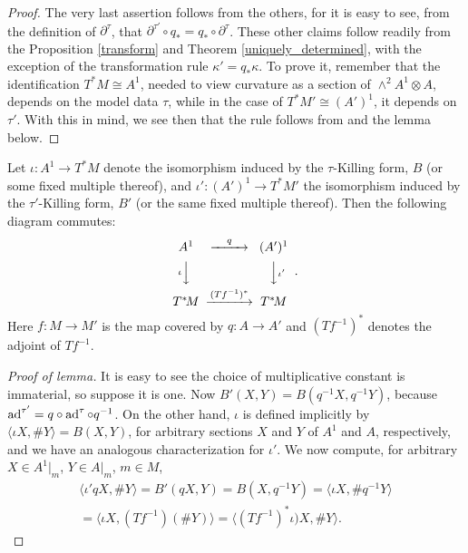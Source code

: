 \documentclass[leqno,12pt]{amsart} %
\begin{document}
\begin{proof}
  The very last assertion follows from the others, for it is easy to see, from the
  definition  of $\partial^\tau$, that
  $\partial^{\tau'} \circ q_* = q_* \circ \partial^\tau$. These other claims follow
  readily from the Proposition \ref{transform} and Theorem \ref{uniquely_determined}, with
  the exception of the transformation rule $\kappa' = q_* \kappa $. To prove it, remember
  that the identification $T^*\!M \cong A^1$, needed to view curvature as a section of
  $\wedge^2 A^1 \otimes A$, depends on the model data $\tau $, while in the case of
  $T^*\!M' \cong (A')^1$, it depends on $\tau'$. With this in mind, we see then that the
  rule follows from  and the lemma below.
\end{proof}

\begin{lemma}
  Let $\iota\colon A^1 \rightarrow T^*\!M $ denote the isomorphism induced by the
  $\tau$-Killing form, $B$ (or some fixed multiple thereof), and
  ${\iota'} \colon (A')^1 \rightarrow T^*\!M' $ the isomorphism induced by the
  $\tau'$-Killing form, $B'$ (or the same fixed multiple thereof). Then the
  following diagram commutes:
  \begin{equation*}\label{morph}
    \begin{CD}
      A^1 @>{q}>> (A')^1 \\
       @V{\iota}VV @VV{{\iota'}}V \\
       T^*\!M @>{(Tf^{-1})^*}>> T^*\!M
     \end{CD}\enspace.
   \end{equation*}
   Here $f \colon M \rightarrow M'$ is the map covered by $q \colon A \rightarrow A'$ and
   $(Tf^{-1})^*$ denotes the adjoint of $Tf^{-1}$.
\end{lemma}
\begin{proof}[Proof of lemma]
  It is easy to see the choice of multiplicative constant is immaterial, so suppose it is
  one. Now $B'(X, Y) = B(q^{-1}X, q^{-1}Y)$, because
  $\operatorname{ad}^{\tau'} = q \circ \operatorname{ad}^\tau \circ q^{-1}$. On the other hand, $\iota$ is
  defined implicitly by $\langle \iota X, \#Y\rangle = B(X, Y)$, for arbitrary sections
  $X$ and $Y$ of $A^1$ and $A$, respectively, and we have an analogous characterization
  for ${\iota'}$. We now compute, for arbitrary $X \in A^1|_m$, $Y \in A|_m$, $m \in M$,
  \begin{multline*}
    \langle {\iota'}qX, \# Y\rangle = B'(qX, Y) = B(X, q^{-1}Y)
    = \langle \iota X,\# q^{-1}Y\rangle \\
    = \langle \iota X,(Tf^{-1})(\#Y)\rangle
    = \langle (Tf^{-1})^*\iota)X,\#Y\rangle.
  \end{multline*}
\end{proof}
\end{document}
